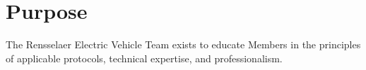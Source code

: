 \section{Purpose}
\label{purpose}
The Rensselaer Electric Vehicle Team exists to educate Members in the principles of applicable protocols, technical expertise, and professionalism.